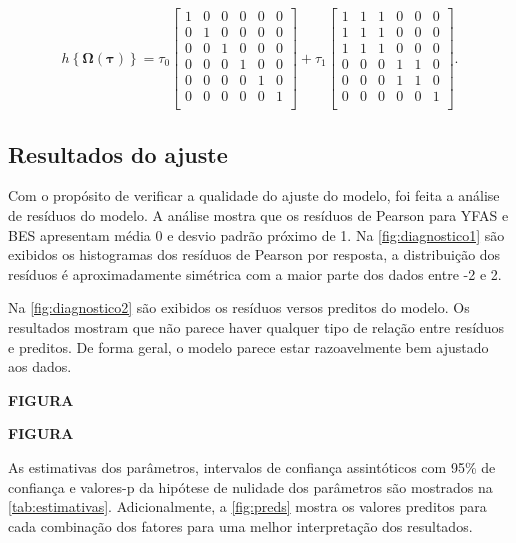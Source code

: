 \documentclass[AMA,STIX1COL]{WileyNJD-v2}
\begin{document}
\begin{equation}
h\left \{ \boldsymbol{\Omega}(\boldsymbol{\tau}) \right \} = 
\tau_0 \begin{bmatrix}
1 & 0 & 0 & 0 & 0 & 0\\ 
0 & 1 & 0 & 0 & 0 & 0\\ 
0 & 0 & 1 & 0 & 0 & 0\\ 
0 & 0 & 0 & 1 & 0 & 0\\ 
0 & 0 & 0 & 0 & 1 & 0\\ 
0 & 0 & 0 & 0 & 0 & 1\\ 
\end{bmatrix} + 
\tau_1 \begin{bmatrix}
1 & 1 & 1 & 0 & 0 & 0\\ 
1 & 1 & 1 & 0 & 0 & 0\\ 
1 & 1 & 1 & 0 & 0 & 0\\ 
0 & 0 & 0 & 1 & 1 & 0\\ 
0 & 0 & 0 & 1 & 1 & 0\\ 
0 & 0 & 0 & 0 & 0 & 1\\ 
\end{bmatrix}.
\end{equation}

\subsection{Resultados do ajuste}

Com o propósito de verificar a qualidade do ajuste do modelo, foi feita a análise de resíduos do modelo. A análise mostra que os resíduos de Pearson para YFAS e BES apresentam média 0 e desvio padrão próximo de 1. Na \autoref{fig:diagnostico1} são exibidos os histogramas dos resíduos de Pearson por resposta, a distribuição dos resíduos é aproximadamente simétrica com a maior parte dos dados entre -2 e 2.

Na \autoref{fig:diagnostico2} são exibidos os resíduos versos preditos do modelo. Os resultados mostram que não parece haver qualquer tipo de relação entre resíduos e preditos. De forma geral, o modelo parece estar razoavelmente bem ajustado aos dados.

\textbf{FIGURA}

\textbf{FIGURA}

As estimativas dos parâmetros, intervalos de confiança assintóticos com 95\% de confiança e valores-p da hipótese de nulidade dos parâmetros são mostrados na \autoref{tab:estimativas}. Adicionalmente, a \autoref{fig:preds} mostra os valores preditos para cada combinação dos fatores para uma melhor interpretação dos resultados.
\end{document}
